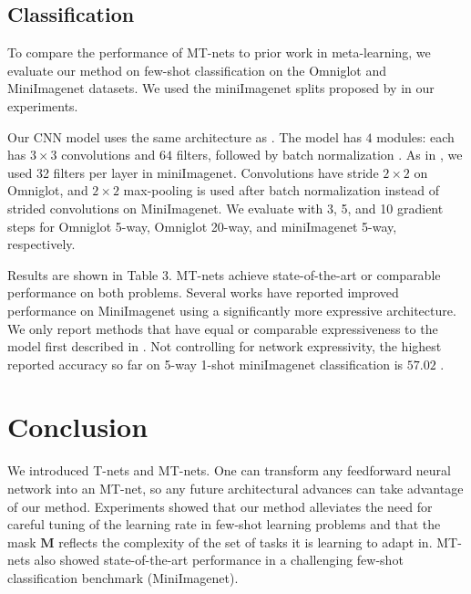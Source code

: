 \documentclass{article}
\newcommand{\M}{\mathbf{M}}
\newcommand{\mask}{\M}
\begin{document}
\subsection{Classification }

To compare the performance of MT-nets to prior work in meta-learning, 
we evaluate our method on few-shot classification on the Omniglot \cite{Lake2015science} and MiniImagenet \cite{RaviS2017iclr} datasets.
We used the miniImagenet splits proposed by \cite{RaviS2017iclr} in our experiments.
\iffalse
The Omniglot dataset, sometimes referred to as the 'transpose of MNIST', consists of 1623 character classes from 50 different alphabets and has only 20 instances of each.
The MiniImagenet dataset is a subset of the full ImageNet dataset which has 100 different classes with 600 examples of each class.
\fi

Our CNN model uses the same architecture as \cite{FinnC2017icml}.
The model has $4$ modules: each has $3 \times 3$ convolutions and $64$ filters, followed by batch normalization \cite{Ioffe2015icml}.
As in \cite{FinnC2017icml}, we used 32 filters per layer in miniImagenet.
Convolutions have stride $2 \times 2$ on Omniglot, and $2 \times 2$ max-pooling is used after batch normalization
instead of strided convolutions on MiniImagenet.
We evaluate with 3, 5, and 10 gradient steps for Omniglot 5-way, Omniglot 20-way, and miniImagenet 5-way, respectively.

Results are shown in Table 3.
MT-nets achieve state-of-the-art or comparable performance on both problems.
Several works \cite{Mishra2018iclr,MunkhdalaiT2017icml,Sung2017arxiv} have reported improved performance on MiniImagenet using a significantly more expressive architecture.
We only report methods that have equal or comparable expressiveness to the model first described in \cite{VinyalsO2016nips}.
Not controlling for network expressivity, the highest reported accuracy so far on 5-way 1-shot miniImagenet classification is $57.02$ \cite{Sung2017arxiv}.



\section{Conclusion}

We introduced T-nets and MT-nets.
One can transform any feedforward neural network into an MT-net, so any future architectural advances can take advantage of our method.
Experiments showed that our method alleviates the need for careful tuning of the learning rate in few-shot learning problems 
and that the mask $\mask$ reflects the complexity of the set of tasks it is learning to adapt in.
MT-nets also showed state-of-the-art performance in a challenging few-shot classification benchmark (MiniImagenet).
\end{document}
